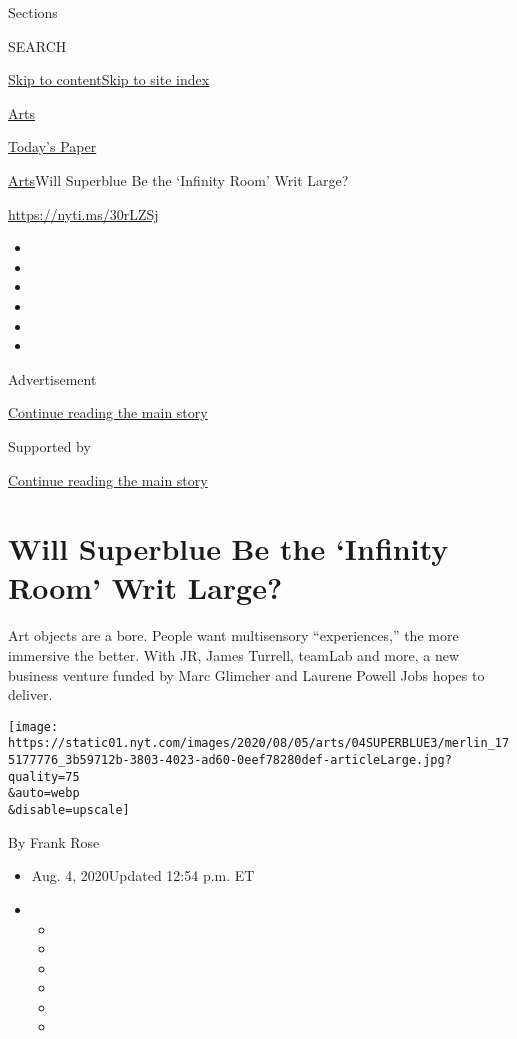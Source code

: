 Sections

SEARCH

\protect\hyperlink{site-content}{Skip to
content}\protect\hyperlink{site-index}{Skip to site index}

\href{https://www.nytimes.com/section/arts}{Arts}

\href{https://myaccount.nytimes.com/auth/login?response_type=cookie\&client_id=vi}{}

\href{https://www.nytimes.com/section/todayspaper}{Today's Paper}

\href{/section/arts}{Arts}\textbar{}Will Superblue Be the `Infinity
Room' Writ Large?

\url{https://nyti.ms/30rLZSj}

\begin{itemize}
\item
\item
\item
\item
\item
\item
\end{itemize}

Advertisement

\protect\hyperlink{after-top}{Continue reading the main story}

Supported by

\protect\hyperlink{after-sponsor}{Continue reading the main story}

\hypertarget{will-superblue-be-the-infinity-room-writ-large}{%
\section{Will Superblue Be the `Infinity Room' Writ
Large?}\label{will-superblue-be-the-infinity-room-writ-large}}

Art objects are a bore. People want multisensory ``experiences,'' the
more immersive the better. With JR, James Turrell, teamLab and more, a
new business venture funded by Marc Glimcher and Laurene Powell Jobs
hopes to deliver.

\texttt{[image: https://static01.nyt.com/images/2020/08/05/arts/04SUPERBLUE3/merlin\_175177776\_3b59712b-3803-4023-ad60-0eef78280def-articleLarge.jpg?quality=75\\\&auto=webp\\\&disable=upscale]}

By Frank Rose

\begin{itemize}
\item
  Aug. 4, 2020Updated 12:54 p.m. ET
\item
  \begin{itemize}
  \item
  \item
  \item
  \item
  \item
  \item
  \end{itemize}
\end{itemize}

